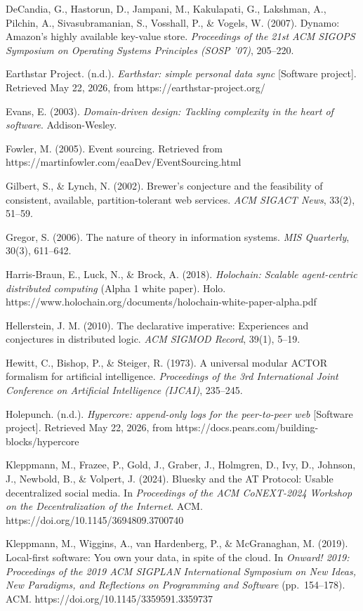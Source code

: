 \documentclass[
]{article}
\begin{document}
DeCandia, G., Hastorun, D., Jampani, M., Kakulapati, G., Lakshman, A.,
Pilchin, A., Sivasubramanian, S., Vosshall, P., \& Vogels, W. (2007).
Dynamo: Amazon's highly available key-value store. \emph{Proceedings of
the 21st ACM SIGOPS Symposium on Operating Systems Principles (SOSP
'07)}, 205--220.

Earthstar Project. (n.d.). \emph{Earthstar: simple personal data sync}
{[}Software project{]}. Retrieved May 22, 2026, from
https://earthstar-project.org/

Evans, E. (2003). \emph{Domain-driven design: Tackling complexity in the
heart of software}. Addison-Wesley.

Fowler, M. (2005). Event sourcing. Retrieved from
https://martinfowler.com/eaaDev/EventSourcing.html

Gilbert, S., \& Lynch, N. (2002). Brewer's conjecture and the
feasibility of consistent, available, partition-tolerant web services.
\emph{ACM SIGACT News}, 33(2), 51--59.

Gregor, S. (2006). The nature of theory in information systems.
\emph{MIS Quarterly}, 30(3), 611--642.

Harris-Braun, E., Luck, N., \& Brock, A. (2018). \emph{Holochain:
Scalable agent-centric distributed computing} (Alpha 1 white paper).
Holo.
https://www.holochain.org/documents/holochain-white-paper-alpha.pdf

Hellerstein, J. M. (2010). The declarative imperative: Experiences and
conjectures in distributed logic. \emph{ACM SIGMOD Record}, 39(1),
5--19.

Hewitt, C., Bishop, P., \& Steiger, R. (1973). A universal modular ACTOR
formalism for artificial intelligence. \emph{Proceedings of the 3rd
International Joint Conference on Artificial Intelligence (IJCAI)},
235--245.

Holepunch. (n.d.). \emph{Hypercore: append-only logs for the
peer-to-peer web} {[}Software project{]}. Retrieved May 22, 2026, from
https://docs.pears.com/building-blocks/hypercore

Kleppmann, M., Frazee, P., Gold, J., Graber, J., Holmgren, D., Ivy, D.,
Johnson, J., Newbold, B., \& Volpert, J. (2024). Bluesky and the AT
Protocol: Usable decentralized social media. In \emph{Proceedings of the
ACM CoNEXT-2024 Workshop on the Decentralization of the Internet}. ACM.
https://doi.org/10.1145/3694809.3700740

Kleppmann, M., Wiggins, A., van Hardenberg, P., \& McGranaghan, M.
(2019). Local-first software: You own your data, in spite of the cloud.
In \emph{Onward! 2019: Proceedings of the 2019 ACM SIGPLAN International
Symposium on New Ideas, New Paradigms, and Reflections on Programming
and Software} (pp.~154--178). ACM.
https://doi.org/10.1145/3359591.3359737
\end{document}
